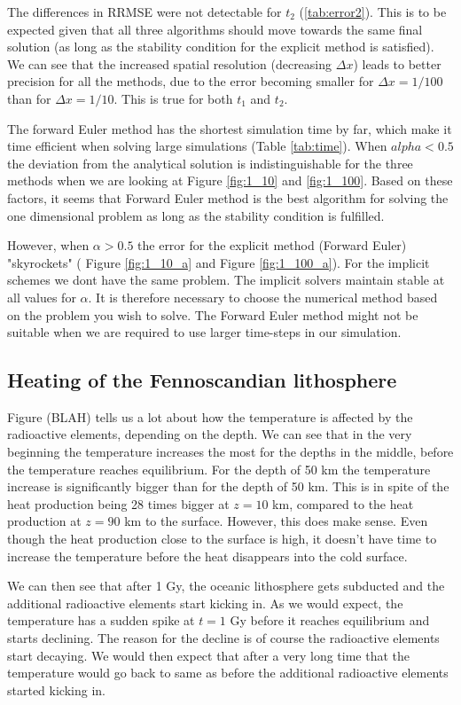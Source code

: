 \documentclass{article}
\begin{document}
\begin{multicols}{2}
The differences in RRMSE were not detectable for $t_2$ (\ref{tab:error2}). This is to be expected given that all three algorithms should move towards the same final solution (as long as the stability condition for the explicit method is satisfied). We can see that the increased spatial resolution (decreasing $\Delta x$) leads to better precision for all the methods, due to the error becoming smaller for $\Delta x=1/100$ than for $\Delta x = 1/10$. This is true for both $t_1$ and $t_2$. 

The forward Euler method has the shortest simulation time by far, which make it time efficient when solving large simulations (Table \ref{tab:time}). When $alpha<0.5$ the deviation from the analytical solution is indistinguishable for the three methods when we are looking at Figure \ref{fig:1_10} and \ref{fig:1_100}. Based on these factors, it seems that Forward Euler method is the best algorithm for solving the one dimensional problem as long as the stability condition is fulfilled. 

However, when $\alpha>0.5$ the error for the explicit method (Forward Euler) "skyrockets" ( Figure \ref{fig:1_10_a} and Figure \ref{fig:1_100_a}). For the implicit schemes we dont have the same problem. The implicit solvers maintain stable at all values for $\alpha$. It is therefore necessary to choose the numerical method based on the problem you wish to solve. The Forward Euler method might not be suitable when we are required to use larger time-steps in our simulation. 

\subsection{Heating of the Fennoscandian lithosphere}

Figure (BLAH) tells us a lot about how the temperature is affected by the radioactive elements, depending on the depth. We can see that in the very beginning the temperature increases the most for the depths in the middle, before the temperature reaches equilibrium. For the depth of 50 km the temperature increase is significantly bigger than for the depth of 50 km. This is in spite of the heat production being 28 times bigger at $z=10$ km, compared to the heat production at $z=90$ km to the surface. However, this does make sense. Even though the heat production close to the surface is high, it doesn't have time to increase the temperature before the heat disappears into the cold surface. 

We can then see that after 1 Gy, the oceanic lithosphere gets subducted and the additional radioactive elements start kicking in. As we would expect, the temperature has a sudden spike at $t=1$ Gy before it reaches equilibrium and starts declining. The reason for the decline is of course the radioactive elements start decaying. We would then expect that after a very long time that the temperature would go back to same as before the additional radioactive elements started kicking in. 


\end{multicols}
\end{document}
